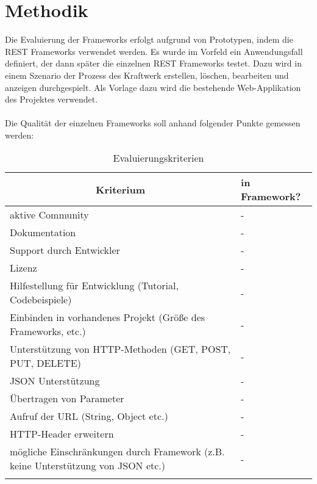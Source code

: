 \documentclass[a4paper,10pt,german,public]{INSOexpose}
\begin{document}
\section{Methodik}

Die Evaluierung der Frameworks erfolgt aufgrund von Prototypen, indem die REST Frameworks verwendet werden. Es wurde im Vorfeld ein Anwendungsfall definiert, der dann später die einzelnen REST Frameworks testet. Dazu wird in einem Szenario der Prozess des Kraftwerk erstellen, löschen, bearbeiten und anzeigen durchgespielt. Als Vorlage dazu wird die bestehende Web-Applikation des Projektes verwendet.
\\\\
Die Qualität der einzelnen Frameworks soll anhand folgender Punkte gemessen werden:
\begin{spacing}{1.4}
\begin{longtable}{|p{.5 \linewidth}|p{.5 \linewidth}|}
	\hline
	\multicolumn{1}{|c|}{\textbf{Kriterium}} & \textbf{in Framework?} \\ 
	\hline \hline 
	aktive Community & - \\ 
	\hline
	Dokumentation & - \\ 
	\hline
	Support durch Entwickler & - \\
	\hline
	Lizenz & - \\
	\hline
	Hilfestellung für Entwicklung \newline (Tutorial, Codebeispiele) & - \\
	\hline
	Einbinden in vorhandenes Projekt \newline (Größe des Frameworks, etc.) & - \\
	\hline
	Unterstützung von HTTP-Methoden \newline (GET, POST, PUT, DELETE) & - \\
	\hline 
	JSON Unterstützung & - \\
	\hline
	Übertragen von Parameter  & - \\
	\hline
	Aufruf der URL (String, Object etc.) & - \\
	\hline
	HTTP-Header erweitern & - \\
	\hline 
	mögliche Einschränkungen durch Framework \newline (z.B. keine Unterstützung von JSON etc.) & - \\
	\hline 
	\caption{Evaluierungskriterien}
	\label{tab:tabEvaluierungskriterien}
\end{longtable}
\end{spacing}
\end{document}
